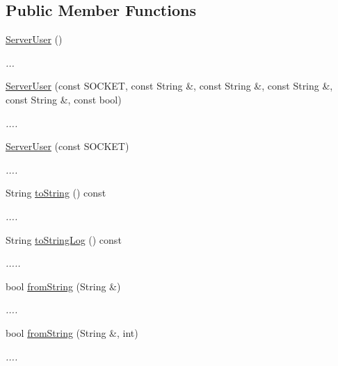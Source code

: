 \subsection*{Public Member Functions}
\begin{DoxyCompactItemize}
\item 
\hyperlink{classServerUser_aabd76de5124914eb323ea964b50595c5}{Server\+User} ()
\begin{DoxyCompactList}\small\item\em ... \end{DoxyCompactList}\item 
\hyperlink{classServerUser_a3cca664c936634392a5246c422442a49}{Server\+User} (const S\+O\+C\+K\+ET, const String \&, const String \&, const String \&, const String \&, const bool)
\begin{DoxyCompactList}\small\item\em .... \end{DoxyCompactList}\item 
\hyperlink{classServerUser_a01a83ba512b3aabbfd47dd4b72531255}{Server\+User} (const S\+O\+C\+K\+ET)
\begin{DoxyCompactList}\small\item\em .... \end{DoxyCompactList}\item 
String \hyperlink{classServerUser_a7b0aa031af58d004834d15212e439ef1}{to\+String} () const 
\begin{DoxyCompactList}\small\item\em .... \end{DoxyCompactList}\item 
String \hyperlink{classServerUser_a7822915335144b12ad6793002a978c85}{to\+String\+Log} () const 
\begin{DoxyCompactList}\small\item\em ..... \end{DoxyCompactList}\item 
bool \hyperlink{classServerUser_aeed52246e162281d7a1c38cd9fe2eb93}{from\+String} (String \&)
\begin{DoxyCompactList}\small\item\em .... \end{DoxyCompactList}\item 
bool \hyperlink{classServerUser_a0bc2c243319fe618849f8c4842c820c0}{from\+String} (String \&, int)
\begin{DoxyCompactList}\small\item\em .... \end{DoxyCompactList}\item 

\end{DoxyCompactItemize}
